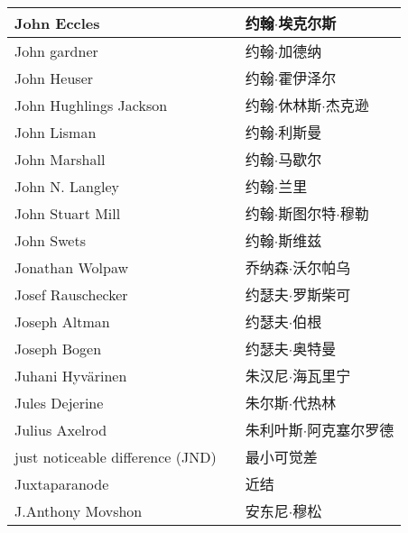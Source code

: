 \begin{longtable}{lll}
	\midrule
	John Eccles   && 约翰$\cdot$埃克尔斯  \\
	
	\midrule
	John gardner   && 约翰$\cdot$加德纳  \\
	
	\midrule
	John Heuser   && 约翰$\cdot$霍伊泽尔  \\
	
	\midrule
	John Hughlings Jackson   && 约翰$\cdot$休林斯$\cdot$杰克逊  \\
	
	\midrule
	John Lisman   && 约翰$\cdot$利斯曼  \\
	
	\midrule
	John Marshall   && 约翰$\cdot$马歇尔  \\
	
	\midrule
	John N. Langley   && 约翰$\cdot$兰里  \\
	
	\midrule
	John Stuart Mill   && 约翰$\cdot$斯图尔特$\cdot$穆勒  \\
	
	\midrule
	John Swets   && 约翰$\cdot$斯维兹  \\
	
	\midrule
	Jonathan Wolpaw   && 乔纳森$\cdot$沃尔帕乌  \\
	
	\midrule
	Josef Rauschecker   && 约瑟夫$\cdot$罗斯柴可  \\
	
	\midrule
	Joseph Altman   && 约瑟夫$\cdot$伯根  \\
	
	\midrule
	Joseph Bogen   && 约瑟夫$\cdot$奥特曼  \\
	
	\midrule
	Juhani Hyvärinen   && 朱汉尼$\cdot$海瓦里宁  \\
	
	\midrule
	Jules Dejerine   && 朱尔斯$\cdot$代热林  \\
	
	\midrule
	Julius Axelrod   && 朱利叶斯$\cdot$阿克塞尔罗德  \\
	
	\midrule
	just noticeable difference (JND)   && 最小可觉差  \\
	
	\midrule
	Juxtaparanode   && 近结  \\
	
	\midrule
	J.Anthony Movshon   && 安东尼$\cdot$穆松  \\
	

\end{longtable}
